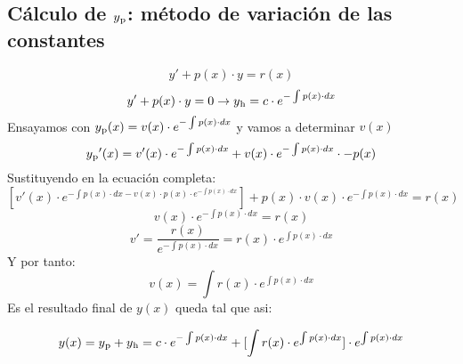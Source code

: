 \documentclass{article}
\begin{document}
\subsection{Cálculo de $y\textsubscript{p}$: método de variación de las constantes}
\[y'+p(x)\cdot y=r(x)\]
\[y'+p(x)\cdot y=0 \rightarrow y\textsubscript{h}=c\cdot e^{-\int p(x)\cdot dx}\]
Ensayamos con $y\textsubscript{p}(x)=v(x)\cdot e^{-\int p(x)\cdot dx}$ y vamos a determinar $v(x)$
\[y\textsubscript{p}'(x) = v'(x)\cdot e^{-\int p(x)\cdot dx}+v(x) \cdot e^{-\int p(x)\cdot dx} \cdot -p(x)\]
Sustituyendo en la ecuación completa:
\[ [v'(x)\cdot e^{-\int p(x)\cdot dx- v(x)\cdot p(x) \cdot e^{-\int p(x)\cdot dx}}]+p(x)\cdot v(x)\cdot e^{-\int p(x)\cdot dx}=r(x)\]
\[v(x)\cdot e^{-\int p(x)\cdot dx}=r(x)\]
\[v'=\frac{r(x)}{ e^{-\int p(x)\cdot dx}}=r(x)\cdot e^{\int p(x)\cdot dx}\]
Y por tanto:
\[v(x)=\int r(x)\cdot e^{\int p(x)\cdot dx}\]
Es el resultado final de $y(x)$ queda tal que asi:

\[ y(x) = y\textsubscript{p} + y\textsubscript{h} = c\cdot e^{-\int p(x)\cdot dx}+[\int r(x)\cdot e^{\int p(x)\cdot dx}]\cdot e^{\int p(x)\cdot dx}\]
\end{document}
